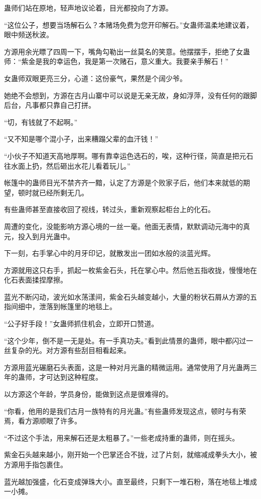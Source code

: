 \begin{this_body}
蛊师们站在原地，轻声地议论着，目光都投向了方源。

“这位公子，想要当场解石么？本赌场免费为您开印解石。”女蛊师温柔地建议着，眼中频送秋波。

方源用余光瞟了四周一下，嘴角勾勒出一丝莫名的笑意。他摆摆手，拒绝了女蛊师：“紫金是我的幸运色，我是第一次赌石，意义重大。我要亲手解石！”

女蛊师双眼更亮三分，心道：这份豪气，果然是个阔少爷。

她绝不会想到，方源在古月山寨中可以说是无亲无故，身如浮萍，没有任何的跟脚后台，凡事都只靠自己打拼。

“切，有钱就了不起啊。”

“又不知是哪个混小子，出来糟蹋父辈的血汗钱！”

“小伙子不知道天高地厚啊。哪有靠幸运色选石的，唉，这种行径，简直是把元石往水面上扔，然后砸出水花儿看着玩儿。”

帐篷中的蛊师目光不禁齐齐一黯，认定了方源是个败家子后，他们本来就低的期望，顿时就已经所剩无几。

有些蛊师甚至直接收回了视线，转过头，重新观察起柜台上的化石。

周遭的变化，没能影响方源心境的一丝一毫。他面无表情，默默调动元海中的真元，投入到月光蛊中。

下一刻，右手掌心中的月牙印记，就散发出一团如水般的淡蓝光辉。

方源就用这只右手，抓起一枚紫金石头，托在掌心中。然后他五指收拢，慢慢地在化石表面揉捏摩擦。

蓝光不断闪动，波光如水荡漾间，紫金石头越变越小，大量的粉状石屑从方源的五指间细中，泄落到帐篷里的地毯上。

“公子好手段！”女蛊师抓住机会，立即开口赞道。

“这个少年，倒不是一无是处。有一手真功夫。”看到此情景的蛊师，眼中都闪过一丝复杂的光。对方源有些刮目相看起来。

方源用蓝光碾磨石头表面，这是一种对月光蛊的精微运用。通常使用了月光蛊两三年的蛊师，才可达到这种程度。

以方源这个年龄，学员身份，能做到这点是很难得的。

“你看，他用的是我们古月一族特有的月光蛊。”有些蛊师发现这点，顿时与有荣焉，看方源顺眼了许多。

“不过这个手法，用来解石还是太粗暴了。”一些老成持重的蛊师，则在摇头。

紫金石头越来越小，刚开始一个巴掌还合不拢，过了片刻，就缩减成拳头大小，被方源用手指包裹住。

蓝光越加强盛，化石变成弹珠大小。直至最终，只剩下一堆石粉，落在地毯上堆成一小摊。


\end{this_body}
